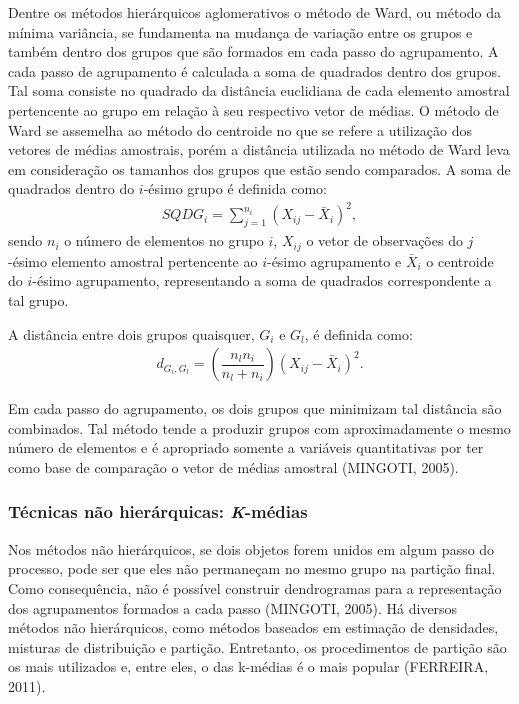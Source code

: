 \documentclass[12pt, a4paper,brazil,oneside]{article}
\begin{document}
	Dentre os métodos hierárquicos aglomerativos o método de Ward, ou método da mínima variância, se fundamenta na mudança de variação entre os grupos e também dentro dos grupos que são formados em cada passo do agrupamento. A cada passo de agrupamento é calculada a soma de quadrados dentro dos grupos. Tal soma consiste no quadrado da distância euclidiana de cada elemento amostral pertencente ao grupo em relação à seu respectivo vetor de médias. O método de Ward se assemelha ao método do centroide no que se refere a utilização dos vetores de médias amostrais, porém a distância utilizada no método de Ward leva em consideração os tamanhos dos grupos que estão sendo comparados. A soma de quadrados dentro do $i$-ésimo grupo é definida como:  
	\begin{align*}
	SQDG_i = \sum_{j=1}^{n_i}(X_{ij} - \bar{X}_{i})^2,
	\end{align*}
	sendo $n_i$ o número de elementos no grupo $i$, $X_{ij}$ o vetor de observações do $j$-ésimo elemento amostral pertencente ao $i$-ésimo agrupamento e $\bar{X}_{i}$ o centroide do $i$-ésimo agrupamento, representando a soma de quadrados correspondente a tal grupo.
	
	A distância entre dois grupos quaisquer, $G_i$ e $G_l$, é definida como:
	\begin{align*}
	d_{ G_i,G_l} = \left(\dfrac{n_l n_i}{n_l + n_i}\right)(X_{ij} - \bar{X}_{i})^2.			
	\end{align*}
	
	Em cada passo do agrupamento, os dois grupos que minimizam tal distância são combinados. Tal método tende a produzir grupos com aproximadamente o mesmo número de elementos e é apropriado somente a variáveis quantitativas por ter como base de comparação o vetor de médias amostral (MINGOTI, 2005).
	
	\subsubsection{Técnicas não hierárquicas: \textit{K}-médias}
	
	Nos métodos não hierárquicos, se dois objetos forem unidos em algum passo do  processo, pode ser que eles não permaneçam no mesmo grupo na partição final.  Como consequência, não é possível construir dendrogramas para a representação dos agrupamentos formados a cada passo (MINGOTI, 2005). Há diversos métodos não hierárquicos, como métodos baseados em estimação de densidades, misturas de distribuição e partição. Entretanto, os procedimentos de partição são os mais utilizados e, entre eles, o das k-médias é o mais popular (FERREIRA, 2011).
	
\end{document}
